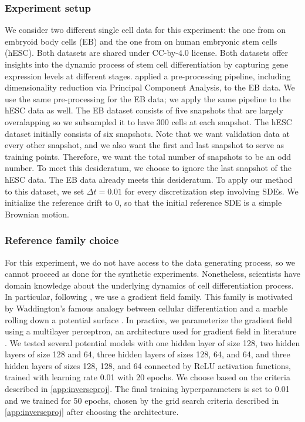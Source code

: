 \subsubsection{Experiment setup} 
\label{app:singlecellsetup}
We consider two different single cell data for this experiment: the one from \citet{moon2019visualizing} on embryoid body cells (EB) and the one from \citet{chu2016single} on human embryonic stem cells (hESC). Both datasets are shared under CC-by-4.0 license. Both datasets offer insights into the dynamic process of stem cell differentiation by capturing gene expression levels at different stages.
\citet{tong2020trajectorynet} applied a pre-processing pipeline, including dimensionality reduction via Principal Component Analysis, to the EB data. We use the same pre-processing for the EB data; we apply the same pipeline to the hESC data as well. The EB dataset consists of five snapshots that are largely overalapping so we subsampled it to have 300 cells at each snapshot. The hESC dataset initially consists of six snapshots. Note that we want validation data at every other snapshot, and we also want the first and last snapshot to serve as training points. Therefore, we want the total number of snapshots to be an odd number. To meet this desideratum, we choose to ignore the last snapshot of the hESC data. The EB data already meets this desideratum. To apply our method to this dataset, we set $\Delta t = 0.01$ for every discretization step involving SDEs. We initialize the reference drift to 0, so that the initial reference SDE is a simple Brownian motion.

\subsubsection{Reference family choice} 
\label{app:eb_implementation}
For this experiment, we do not have access to the data generating process, so we cannot proceed as done for the synthetic experiments. Nonetheless, scientists have domain knowledge about the underlying dynamics of cell differentiation process. In particular, following \citet{wang2011quantifying, weinreb2018fundamental, lavenant2024toward}, we use a gradient field family. This family is motivated by Waddington's famous analogy between cellular differentiation and a marble rolling down a potential surface \citep{waddington2014strategy}. In practice, we parameterize the gradient field using a multilayer perceptron, an architecture used for gradient field in literature \citep[e.g.,][]{greydanus2019hamiltonian,lin2023computing}. We tested several potential models with one hidden layer of size 128, two hidden layers of size 128 and 64, three hidden layers of sizes 128, 64, and 64, and three hidden layers of sizes 128, 128, and 64 connected by ReLU activation functions, trained with learning rate 0.01 with 20 epochs. We choose based on the criteria described in \cref{app:inverseproj}. The final training hyperparameters is set to 0.01 and we trained for 50 epochs, chosen by the grid search criteria described in \cref{app:inverseproj} after choosing the architecture.


